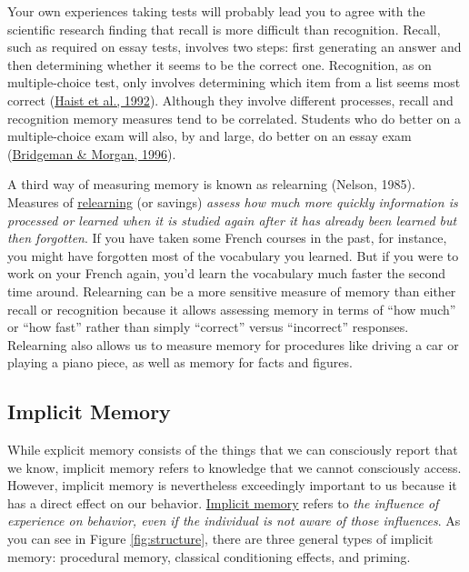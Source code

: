 \documentclass[
]{krantz}
\begin{document}
Your own experiences taking tests will probably lead you to agree with the scientific research finding that recall is more difficult than recognition. Recall, such as required on essay tests, involves two steps: first generating an answer and then determining whether it seems to be the correct one. Recognition, as on multiple-choice test, only involves determining which item from a list seems most correct (\protect\hyperlink{ref-Haist1992}{Haist et al., 1992}). Although they involve different processes, recall and recognition memory measures tend to be correlated. Students who do better on a multiple-choice exam will also, by and large, do better on an essay exam (\protect\hyperlink{ref-Bridgeman1996}{Bridgeman \& Morgan, 1996}).

A third way of measuring memory is known as relearning (Nelson, 1985). Measures of \protect\hyperlink{relearning}{relearning} (or savings) \emph{assess how much more quickly information is processed or learned when it is studied again after it has already been learned but then forgotten}. If you have taken some French courses in the past, for instance, you might have forgotten most of the vocabulary you learned. But if you were to work on your French again, you'd learn the vocabulary much faster the second time around. Relearning can be a more sensitive measure of memory than either recall or recognition because it allows assessing memory in terms of ``how much'' or ``how fast'' rather than simply ``correct'' versus ``incorrect'' responses. Relearning also allows us to measure memory for procedures like driving a car or playing a piano piece, as well as memory for facts and figures.

\hypertarget{implicit-memory}{%
\subsection*{Implicit Memory}\label{implicit-memory}}


While explicit memory consists of the things that we can consciously report that we know, implicit memory refers to knowledge that we cannot consciously access. However, implicit memory is nevertheless exceedingly important to us because it has a direct effect on our behavior. \protect\hyperlink{implicit-memory}{Implicit memory} refers to \emph{the influence of experience on behavior, even if the individual is not aware of those influences}. As you can see in Figure \ref{fig:structure}, there are three general types of implicit memory: procedural memory, classical conditioning effects, and priming.
\end{document}

